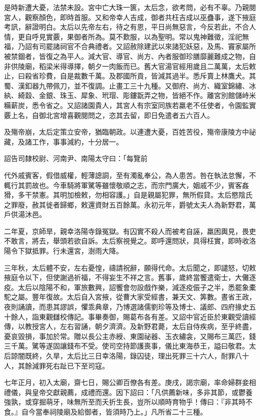 \begin{pinyinscope}
是時新遭大憂，法禁未設。宮中亡大珠一篋，太后念，欲考問，必有不辜。乃親閱宮人，觀察顏色，即時首服。又和帝幸人吉成，御者共枉吉成以巫蠱事，遂下掖庭考訊，辭證明白。太后以先帝左右，待之有恩，平日尚無惡言，今反若此，不合人情，更自呼見實覈，果御者所為。莫不歎服，以為聖明。常以鬼神難徵，淫祀無福，乃詔有司罷諸祠官不合典禮者。又詔赦除建武以來諸犯妖惡，及馬、竇家屬所被禁錮者，皆復之為平人。減大官、導官、尚方、內者服御珍膳靡麗難成之物，自非供陵廟，稻梁米得導擇，朝夕一肉飯而已。舊大官湯官經用歲且二萬萬，太后敕止，曰殺省珍費，自是裁數千萬。及郡國所貢，皆減其過半。悉斥賣上林鷹犬。其蜀、漢釦器九帶佩刀，並不復調。止畫工三十九種。又御府、尚方、織室錦繡、冰紈、綺縠、金銀、珠玉、犀象、玳瑁、彫鏤翫弄之物，皆絕不作。離宮別館儲峙米糒薪炭，悉令省之。又詔諸園貴人，其宮人有宗室同族若羸老不任使者，令園監實覈上名，自御北宮增喜觀閱問之，恣其去留，即日免遣者五六百人。

及殤帝崩，太后定策立安帝，猶臨朝政。以連遭大憂，百姓苦役，殤帝康陵方中祕藏，及諸工作，事事減約，十分居一。

詔告司隸校尉、河南尹、南陽太守曰：「每覽前

代外戚賓客，假借威權，輕薄謥詷，至有濁亂奉公，為人患苦。咎在執法怠懈，不輒行其罰故也。今車騎將軍騭等雖懷敬順之志，而宗門廣大，姻戚不少，賓客姦猾，多干禁憲。其明加檢敕，勿相容護。」自是親屬犯罪，無所假貸。太后愍陰氏之罪廢，赦其徙者歸鄉，敕還資財五百餘萬。永初元年，爵號太夫人為新野君，萬戶供湯沐邑。

二年夏，京師旱，親幸洛陽寺錄冤獄。有囚實不殺人而被考自誣，羸困輿見，畏吏不敢言，將去，舉頭若欲自訴。太后察視覺之。即呼還問狀，具得枉實，即時收洛陽令下獄抵罪。行未還宮，澍雨大降。

三年秋，太后體不安，左右憂惶，禱請祝辭，願得代命。太后聞之，即譴怒，切敕掖庭令以下，但使謝過祈福，不得妄生不祥之言。舊事，歲終當饗遣衛士，大儺逐疫。太后以陰陽不和，軍旅數興，詔饗會勿設戲作樂，減逐疫侲子之半，悉罷象橐駝之屬。豐年復故。太后自入宮掖，從曹大家受經書，兼天文、筭數。晝省王政，夜則誦讀，而患其謬誤，懼乖典章，乃博選諸儒劉珍等及博士、議郎、四府掾史五十餘人，詣東觀讎校傳記。事畢奏御，賜葛布各有差。又詔中官近臣於東觀受讀經傳，以教授宮人，左右習誦，朝夕濟濟。及新野君薨，太后自侍疾病，至乎終盡，憂哀毀損，事加於常。贈以長公主赤綬、東園祕器、玉衣繡衾，又賜布三萬匹，錢三千萬。騭等遂固讓錢布不受。使司空持節護喪事，儀比東海恭王，謚曰敬君。太后諒闇既終，久旱，太后比三日幸洛陽，錄囚徒，理出死罪三十六人，耐罪八十人，其餘減罪死右趾已下至司寇。

七年正月，初入太廟，齋七日，賜公卿百僚各有差。庚戌，謁宗廟，率命婦群妾相禮儀，與皇帝交獻親薦，成禮而還。因下詔曰：「凡供薦新味，多非其節，或鬱養強孰，或穿掘萌牙，味無所至而夭折生長，豈所以順時育物乎！傳曰：『非其時不食。』自今當奉祠陵廟及給御者，皆須時乃上。」凡所省二十三種。


\end{pinyinscope}

